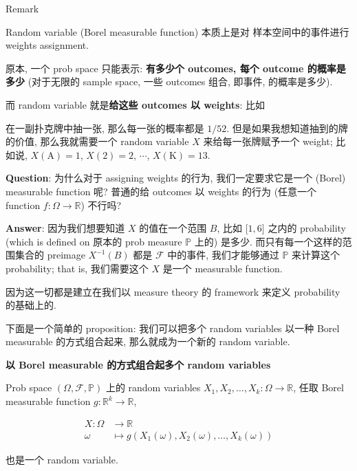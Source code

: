\documentclass{qlnotes-export}
\begin{document}
\begin{qlremark}{Remark}

Random variable (Borel measurable function) 本质上是对 样本空间中的事件进行 weights assignment.

原本, 一个 prob space 只能表示: \textbf{有多少个 outcomes, 每个 outcome 的概率是多少} (对于无限的 sample space, 一些 outcomes 组合, 即事件, 的概率是多少).

而 random variable 就是\textbf{给这些 outcomes 以 weights}: 比如

\begin{example}

在一副扑克牌中抽一张, 那么每一张的概率都是 \(1/52\). 但是如果我想知道抽到的牌的价值, 那么我就需要一个 random variable \(X\) 来给每一张牌赋予一个 weight; 比如说, \(X(\text{A}) = 1\), \(X(2) = 2\), \(\cdots\), \(X(\text{K}) = 13\).\\

\end{example}

\textbf{Question}: 为什么对于 assigning weights 的行为, 我们一定要求它是一个 (Borel) measurable function 呢? 普通的给 outcomes 以 weights 的行为 (任意一个 function \(f:\Omega\rightarrow{\mathbb{R}}\)) 不行吗?

\textbf{Answer}: 因为我们想要知道 \(X\) 的值在一个范围 \(B\), 比如 \(\lbrack 1,6\rbrack\) 之内的 probability (which is defined on 原本的 prob measure \(\mathbb{P}\) 上的) 是多少. 而只有每一个这样的范围集合的 preimage \(X^{- 1}(B)\) 都是 \(\mathcal{F}\) 中的事件, 我们才能够通过 \(\mathbb{P}\) 来计算这个 probability; that is, 我们需要这个 \(X\) 是一个 measurable function.

因为这一切都是建立在我们以 measure theory 的 framework 来定义 probability 的基础上的.\\

\end{qlremark}

下面是一个简单的 proposition: 我们可以把多个 random variables 以一种 Borel measurable 的方式组合起来, 那么就成为一个新的 random variable.

\begin{proposition}{\protect{}\label{kn-borel-measurable-random-variables}{\textbf{以
Borel measurable 的方式组合起多个 random variables}}}

Prob space \((\Omega,\mathcal{F},{\mathbb{P}})\) 上的 random variables \(X_{1},X_{2},\ldots,X_{k}:\Omega\rightarrow{\mathbb{R}}\), 任取 Borel measurable function \(g:{\mathbb{R}}^{k}\rightarrow{\mathbb{R}}\),

\[\begin{matrix}
{X:\Omega} & {\rightarrow{\mathbb{R}}} \\
\omega & {\mapsto g(X_{1}(\omega),X_{2}(\omega),\ldots,X_{k}(\omega))}
\end{matrix}\]

也是一个 random variable.

\end{proposition}
\end{document}
